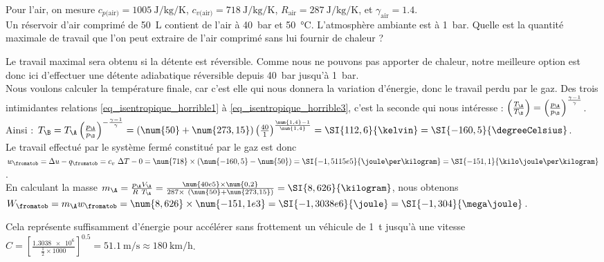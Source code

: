 		\begin{anexample}
			Pour l’air, on mesure $c_{p\text{(air)}} = \SI{1005}{\joule\per\kilogram\per\kelvin}$, $c_{v\text{(air)}} = \SI{718}{\joule\per\kilogram\per\kelvin}$, $R_\text{air} = \SI{287}{\joule\per\kilogram\per\kelvin}$, et $\gamma_\text{air} = \num{1,4}$.\\
			Un réservoir d’air comprimé de \SI{50}{\liter} contient de l’air à \SI{40}{\bar} et \SI{50}{\degreeCelsius}. L’atmosphère ambiante est à \SI{1}{\bar}. Quelle est la quantité maximale de travail que l’on peut extraire de l’air comprimé sans lui fournir de chaleur ?
				\begin{answer}
					Le travail maximal sera obtenu si la détente est réversible. Comme nous ne pouvons pas apporter de chaleur, notre meilleure option est donc ici d’effectuer une détente adiabatique réversible depuis \SI{40}{\bar} jusqu’à \SI{1}{\bar}.\\
					Nous voulons calculer la température finale, car c’est elle qui nous donnera la variation d’énergie, donc le travail perdu par le gaz. Des trois intimidantes relations \ref{eq_isentropique_horrible1} à \ref{eq_isentropique_horrible3}, c’est la seconde qui nous intéresse : $\left( \frac{T_\A}{T_\B} \right)	= \left( \frac{p_\A}{p_\B} \right)^{\frac{\gamma -1}{\gamma}}$. Ainsi : $T_\B = T_\A \left( \frac{p_\A}{p_\B} \right)^{-\frac{\gamma -1}{\gamma}} = (\num{50} + \num{273,15}) \left( \frac{40}{1} \right)^{\frac{\num{1,4} -1}{\num{1,4}}} = \SI{112,6}{\kelvin} = \SI{-160,5}{\degreeCelsius}$.\\
					Le travail effectué par le système fermé constitué par le gaz est donc $w_\fromatob = \Delta u - q_\fromatob = c_v \ \Delta T - 0 = \num{718} \times (\num{-160,5} - \num{50}) = \SI{-1,5115e5}{\joule\per\kilogram} = \SI{-151,1}{\kilo\joule\per\kilogram}$.\\
					En calculant la masse $m_\A = \frac{p_\A V_\A}{R \ T_\A} = \frac{\num{40e5} \times \num{0,2}}{287 \times \ (\num{50} + \num{273,15})} = \SI{8,626}{\kilogram}$, nous obtenons $W_\fromatob = m_\A w_\fromatob = \num{8,626} \times \num{-151,1e3} = \SI{-1,3038e6}{\joule} = \SI{-1,304}{\mega\joule}$.
					\begin{remark} Cela représente suffisamment d’énergie pour accélérer sans frottement un véhicule de \SI{1}{\tonne} jusqu’à une vitesse $C = \left[\frac{\num{1,3038e6}}{\frac{1}{2} \times \num{1000}}\right]^{\num{0,5}} = \SI{51,1}{\metre\per\second} \approx \SI[per-mode = symbol]{180}{\kilo\metre\per\hour}$.\end{remark}

\end{answer}
\end{anexample}
